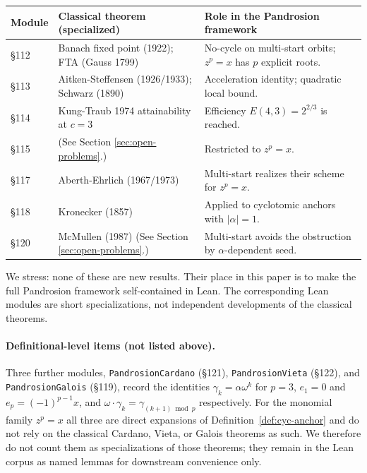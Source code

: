 \documentclass[11pt,a4paper]{article}
\theoremstyle{definition}
\theoremstyle{remark}
\begin{document}
\begin{center}
\small
\begin{tabular}{@{}p{}p{}p{}@{}}
\toprule
\textbf{Module} & \textbf{Classical theorem (specialized)} & \textbf{Role in the Pandrosion framework} \\
\midrule
\S112 & Banach fixed point (1922); FTA (Gauss 1799) & No-cycle on multi-start orbits; $z^p = x$ has $p$ explicit roots. \\
\S113 & Aitken-Steffensen (1926/1933); Schwarz (1890) & Acceleration identity; quadratic local bound. \\
\S114 & Kung-Traub 1974 attainability at $c=3$ & Efficiency $E(4, 3) = 2^{2/3}$ is reached. \\
\S115 & (See Section \ref{sec:open-problems}.) & Restricted to $z^p = x$. \\
\S117 & Aberth-Ehrlich (1967/1973) & Multi-start realizes their scheme for $z^p = x$. \\
\S118 & Kronecker (1857) & Applied to cyclotomic anchors with $|\alpha| = 1$. \\
\S120 & McMullen (1987) (See Section \ref{sec:open-problems}.) & Multi-start avoids the obstruction by $\alpha$-dependent seed. \\
\bottomrule
\end{tabular}
\end{center}

We stress: none of these are new results. Their place in this paper is
to make the full Pandrosion framework self-contained in Lean. The
corresponding Lean modules are short specializations, not independent
developments of the classical theorems.

\paragraph{Definitional-level items (not listed above).} Three further
modules, \texttt{PandrosionCardano} (\S121), \texttt{PandrosionVieta}
(\S122), and \texttt{PandrosionGalois} (\S119), record the identities
$\gamma_k = \alpha\omega^k$ for $p = 3$, $e_1 = 0$ and $e_p = (-1)^{p-1}x$,
and $\omega\cdot\gamma_k = \gamma_{(k+1)\bmod p}$ respectively. For the
monomial family $z^p = x$ all three are direct expansions of
Definition~\ref{def:cyc-anchor} and do not rely on the classical Cardano,
Vieta, or Galois theorems as such. We therefore do not count them as
specializations of those theorems; they remain in the Lean corpus as
named lemmas for downstream convenience only.
\end{document}
